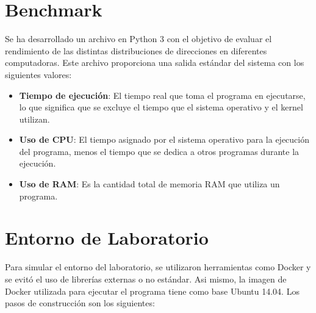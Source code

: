 \documentclass[12pt]{article}
\begin{document}
\section*{Benchmark}
\vspace{-5pt}
Se ha desarrollado un archivo en Python 3 con el objetivo de evaluar el rendimiento de las distintas distribuciones de direcciones en diferentes computadoras. Este archivo proporciona una salida estándar del sistema con los siguientes valores:

\begin{itemize}
	\item \textbf{Tiempo de ejecución}: El tiempo real que toma el programa en ejecutarse, lo que significa que se excluye el tiempo que el sistema operativo y el kernel utilizan.
	
	\item \textbf{Uso de CPU}: El tiempo asignado por el sistema operativo para la ejecución del programa, menos el tiempo que se dedica a otros programas durante la ejecución.
	
	\item  \textbf{Uso de RAM}: Es la cantidad total de memoria RAM que utiliza un programa.
\end{itemize}
%
\section*{Entorno de Laboratorio}
\vspace{-5pt}
Para simular el entorno del laboratorio, se utilizaron herramientas como Docker y se evitó el uso de librerías externas o no estándar. Asi mismo, la imagen de Docker utilizada para ejecutar el programa tiene como base Ubuntu 14.04. Los pasos de construcción son los siguientes:
\end{document}
